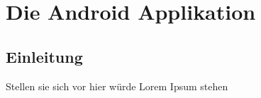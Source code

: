 \section{Die Android Applikation}
\subsection{Einleitung}
Stellen sie sich vor hier würde Lorem Ipsum stehen